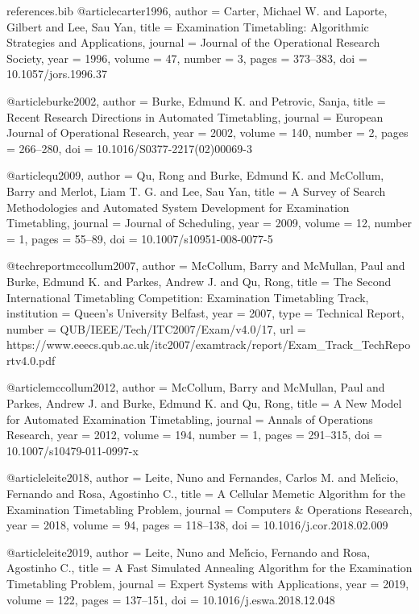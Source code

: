 \begin{filecontents*}{references.bib}
@article{carter1996,
  author = {Carter, Michael W. and Laporte, Gilbert and Lee, Sau Yan},
  title = {Examination Timetabling: Algorithmic Strategies and Applications},
  journal = {Journal of the Operational Research Society},
  year = {1996},
  volume = {47},
  number = {3},
  pages = {373--383},
  doi = {10.1057/jors.1996.37}
}

@article{burke2002,
  author = {Burke, Edmund K. and Petrovic, Sanja},
  title = {Recent Research Directions in Automated Timetabling},
  journal = {European Journal of Operational Research},
  year = {2002},
  volume = {140},
  number = {2},
  pages = {266--280},
  doi = {10.1016/S0377-2217(02)00069-3}
}

@article{qu2009,
  author = {Qu, Rong and Burke, Edmund K. and McCollum, Barry and Merlot, Liam T. G. and Lee, Sau Yan},
  title = {A Survey of Search Methodologies and Automated System Development for Examination Timetabling},
  journal = {Journal of Scheduling},
  year = {2009},
  volume = {12},
  number = {1},
  pages = {55--89},
  doi = {10.1007/s10951-008-0077-5}
}

@techreport{mccollum2007,
  author = {McCollum, Barry and McMullan, Paul and Burke, Edmund K. and Parkes, Andrew J. and Qu, Rong},
  title = {The Second International Timetabling Competition: Examination Timetabling Track},
  institution = {Queen's University Belfast},
  year = {2007},
  type = {Technical Report},
  number = {QUB/IEEE/Tech/ITC2007/Exam/v4.0/17},
  url = {https://www.eeecs.qub.ac.uk/itc2007/examtrack/report/Exam_Track_TechReportv4.0.pdf}
}

@article{mccollum2012,
  author = {McCollum, Barry and McMullan, Paul and Parkes, Andrew J. and Burke, Edmund K. and Qu, Rong},
  title = {A New Model for Automated Examination Timetabling},
  journal = {Annals of Operations Research},
  year = {2012},
  volume = {194},
  number = {1},
  pages = {291--315},
  doi = {10.1007/s10479-011-0997-x}
}

@article{leite2018,
  author = {Leite, Nuno and Fernandes, Carlos M. and Mel{\'\i}cio, Fernando and Rosa, Agostinho C.},
  title = {A Cellular Memetic Algorithm for the Examination Timetabling Problem},
  journal = {Computers \& Operations Research},
  year = {2018},
  volume = {94},
  pages = {118--138},
  doi = {10.1016/j.cor.2018.02.009}
}

@article{leite2019,
  author = {Leite, Nuno and Mel{\'\i}cio, Fernando and Rosa, Agostinho C.},
  title = {A Fast Simulated Annealing Algorithm for the Examination Timetabling Problem},
  journal = {Expert Systems with Applications},
  year = {2019},
  volume = {122},
  pages = {137--151},
  doi = {10.1016/j.eswa.2018.12.048}
}


\end{filecontents*}
